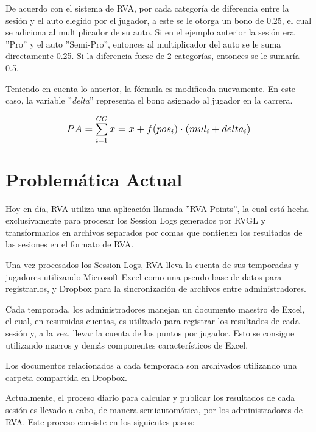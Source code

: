 De acuerdo con el sistema de RVA, por cada categoría de diferencia entre la sesión y el auto elegido por el jugador, a este se le otorga un bono de 0.25, el cual se adiciona al multiplicador de su auto. Si en el ejemplo anterior la sesión era ''Pro'' y el auto ''Semi-Pro'', entonces al multiplicador del auto se le suma directamente 0.25. Si la diferencia fuese de 2 categorías, entonces se le sumaría 0.5.

Teniendo en cuenta lo anterior, la fórmula es modificada nuevamente. En este caso, la variable ''\textit{delta}'' representa el bono asignado al jugador en la carrera.

\[
\mathlarger{{PA} = \sum_{i=1}^{CC}x=x+f(pos_i) \cdot \left(mul_i + delta_i\right)}
\]

\section{Problemática Actual}
Hoy en día,  RVA utiliza una aplicación llamada ''RVA-Points'', la cual está hecha exclusivamente para procesar los Session Logs generados por RVGL y transformarlos en archivos separados por comas que contienen los resultados de las sesiones en el formato de RVA.

Una vez procesados los Session Logs, RVA lleva la cuenta de sus temporadas y jugadores utilizando Microsoft Excel como una pseudo base de datos para registrarlos, y Dropbox para la sincronización de archivos entre administradores.

Cada temporada, los administradores manejan un documento maestro de Excel, el cual, en resumidas cuentas, es utilizado para registrar los resultados de cada sesión y, a la vez, llevar la cuenta de los puntos por jugador. Esto se consigue utilizando macros y demás componentes característicos de Excel.

Los documentos relacionados a cada temporada son archivados utilizando una carpeta compartida en Dropbox.

Actualmente, el proceso diario para calcular y publicar los resultados de cada sesión es llevado a cabo, de manera semiautomática, por los administradores de RVA. Este proceso consiste en los siguientes pasos:

